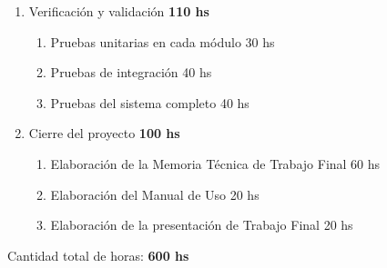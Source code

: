 \documentclass[
11pt, %
]{charter}
\begin{document}
\begin{enumerate}
\begin{enumerate}
	\end{enumerate}
\item Verificación y validación 										\hspace*{\fill}\textbf{110 hs}
	\begin{enumerate}
	\item Pruebas unitarias en cada módulo								\hspace*{\fill}30 hs
	\item Pruebas de integración										\hspace*{\fill}40 hs
	\item Pruebas del sistema completo									\hspace*{\fill}40 hs
	\end{enumerate}
\item Cierre del proyecto												\hspace*{\fill}\textbf{100 hs}
	\begin{enumerate}
	\item Elaboración de la Memoria Técnica de Trabajo Final			\hspace*{\fill}60 hs
	\item Elaboración del Manual de Uso									\hspace*{\fill}20 hs
	\item Elaboración de la presentación de Trabajo Final 				\hspace*{\fill}20 hs
	\end{enumerate}
\end{enumerate}

Cantidad total de horas: 												\hspace*{\fill}\textbf{600 hs}
\end{document}
